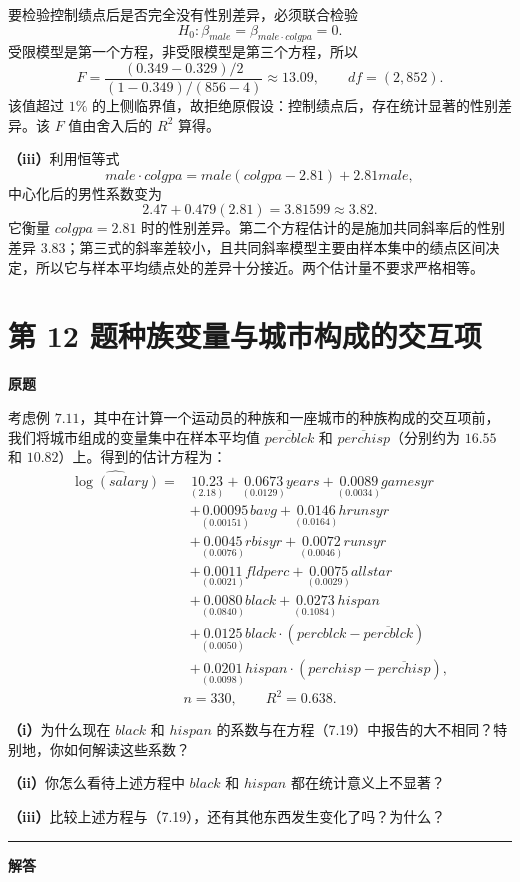 \documentclass[UTF8,a4paper,11pt,fontset=fandol]{ctexart}
\newcommand{\vr}[1]{\mathit{#1}}
\newcommand{\subq}[1]{\par\medskip\noindent\textbf{（#1）}\enspace}
\newcommand{\question}[2]{\def\currentquestiontitle{第 #1 题\quad #2}}
\newcommand{\coef}[2]{\underset{\scriptstyle(#2)}{#1}}
\newenvironment{originalquestion}{%
  \par\medskip\noindent\begin{minipage}{\linewidth}
  \section*{\currentquestiontitle}
  \par\smallskip\noindent\textbf{原题}\par\smallskip
  \begingroup\small\setlength{\parskip}{2.5pt}%
}{%
  \par\endgroup\end{minipage}\par\medskip\Needspace{6\baselineskip}
  \noindent\rule{\linewidth}{0.35pt}\par\smallskip
  \noindent\textbf{解答}\par
}
\begin{document}
要检验控制绩点后是否完全没有性别差异，必须联合检验
\[
H_0:\beta_{\vr{male}}=\beta_{\vr{male}\cdot\vr{colgpa}}=0.
\]
受限模型是第一个方程，非受限模型是第三个方程，所以
\[
F=\frac{(0.349-0.329)/2}{(1-0.349)/(856-4)}
\approx\boxed{13.09},\qquad df=(2,852).
\]
该值超过 $1\%$ 的上侧临界值，故拒绝原假设：控制绩点后，存在统计显著的性别差异。该 $F$ 值由舍入后的 $R^2$ 算得。

\subq{iii}利用恒等式
\[
\vr{male}\cdot\vr{colgpa}
=\vr{male}(\vr{colgpa}-2.81)+2.81\vr{male},
\]
中心化后的男性系数变为
\[
2.47+0.479(2.81)=3.81599\approx3.82.
\]
它衡量 $\vr{colgpa}=2.81$ 时的性别差异。第二个方程估计的是施加共同斜率后的性别差异 $3.83$；第三式的斜率差较小，且共同斜率模型主要由样本集中的绩点区间决定，所以它与样本平均绩点处的差异十分接近。两个估计量不要求严格相等。

\question{12}{种族变量与城市构成的交互项}
\begin{originalquestion}
考虑例 $7.11$，其中在计算一个运动员的种族和一座城市的种族构成的交互项前，我们将城市组成的变量集中在样本平均值 $\overline{\vr{percblck}}$ 和 $\overline{\vr{perchisp}}$（分别约为 $16.55$ 和 $10.82$）上。得到的估计方程为：
\[
\begin{aligned}
\widehat{\log(\vr{salary})}={}&\coef{10.23}{2.18}+\coef{0.0673}{0.0129}\vr{years}
+\coef{0.0089}{0.0034}\vr{gamesyr}\\
&+\coef{0.00095}{0.00151}\vr{bavg}
+\coef{0.0146}{0.0164}\vr{hrunsyr}\\
&+\coef{0.0045}{0.0076}\vr{rbisyr}
+\coef{0.0072}{0.0046}\vr{runsyr}\\
&+\coef{0.0011}{0.0021}\vr{fldperc}
+\coef{0.0075}{0.0029}\vr{allstar}\\
&+\coef{0.0080}{0.0840}\vr{black}
+\coef{0.0273}{0.1084}\vr{hispan}\\
&+\coef{0.0125}{0.0050}\vr{black}\cdot
(\vr{percblck}-\overline{\vr{percblck}})\\
&+\coef{0.0201}{0.0098}\vr{hispan}\cdot
(\vr{perchisp}-\overline{\vr{perchisp}}),
\end{aligned}
\]
\[
n=330,\qquad R^2=0.638.
\]

\subq{i}为什么现在 $\vr{black}$ 和 $\vr{hispan}$ 的系数与在方程（7.19）中报告的大不相同？特别地，你如何解读这些系数？

\subq{ii}你怎么看待上述方程中 $\vr{black}$ 和 $\vr{hispan}$ 都在统计意义上不显著？

\subq{iii}比较上述方程与（7.19），还有其他东西发生变化了吗？为什么？
\end{originalquestion}
\end{document}
